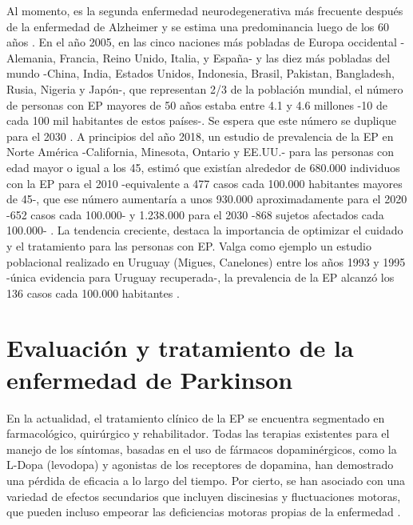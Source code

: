 Al momento, es la segunda enfermedad neurodegenerativa más frecuente después de la enfermedad de Alzheimer y se estima una predominancia luego de los 60 años \cite{GOMEZGONZALEZ2019396,CHAVEZ-LEON2013}.
En el año 2005, en las cinco naciones más pobladas de Europa occidental -Alemania, Francia, Reino Unido, Italia, y España- y las diez más pobladas del mundo -China, India, Estados Unidos, Indonesia, Brasil, Pakistan, Bangladesh, Rusia, Nigeria y Japón-, que representan 2/3 de la población mundial, el número de personas con EP mayores de 50 años estaba entre 4.1 y 4.6 millones -10 de cada 100 mil habitantes de estos países-. Se espera que este número se duplique para el 2030 \cite{Dorsey2007ProjectedNO}.
A principios del año 2018, un estudio de prevalencia de la EP en Norte América -California, Minesota, Ontario y EE.UU.- para las personas con edad mayor o igual a los 45, estimó que existían alrededor de 680.000 individuos con la EP para el 2010 -equivalente a 477 casos cada 100.000 habitantes mayores de 45-, que ese número aumentaría a unos 930.000 aproximadamente para el 2020 -652 casos cada 100.000- y 1.238.000 para el 2030 -868 sujetos afectados cada 100.000- \cite{Marras2018}. La tendencia creciente, destaca la importancia de optimizar el cuidado y el tratamiento para las personas con EP.
Valga como ejemplo un estudio poblacional realizado en Uruguay (Migues, Canelones) entre los años 1993 y 1995 -única evidencia para Uruguay recuperada-, la prevalencia de la EP alcanzó los 136 casos cada 100.000 habitantes \cite{AljanatiR2012}. 

\section{Evaluación y tratamiento de la enfermedad de Parkinson}
En la actualidad, el tratamiento clínico de la EP se encuentra segmentado en farmacológico, quirúrgico y rehabilitador. Todas las terapias existentes para el manejo de los síntomas, basadas en el uso de fármacos dopaminérgicos, como la L-Dopa (levodopa) y agonistas de los receptores de dopamina, han demostrado una pérdida de eficacia a lo largo del tiempo. Por cierto, se han asociado con una variedad de efectos secundarios que incluyen \gls{discinesias} y fluctuaciones motoras, que pueden incluso empeorar las deficiencias motoras propias de la enfermedad \cite{Parisi2016}. 

